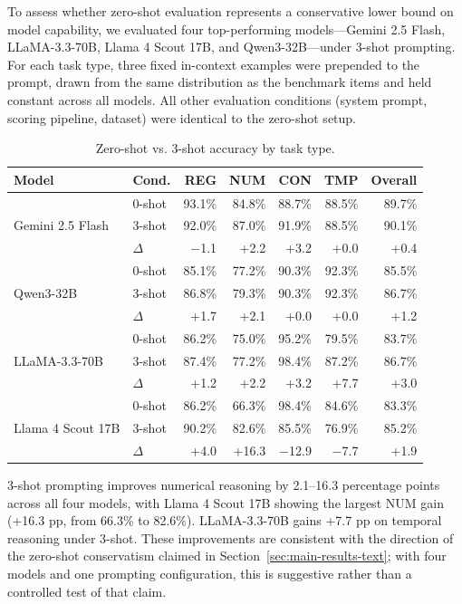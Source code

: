 To assess whether zero-shot evaluation represents a conservative lower bound on model capability, we evaluated four top-performing models---Gemini 2.5 Flash, LLaMA-3.3-70B, Llama 4 Scout 17B, and Qwen3-32B---under 3-shot prompting. For each task type, three fixed in-context examples were prepended to the prompt, drawn from the same distribution as the benchmark items and held constant across all models. All other evaluation conditions (system prompt, scoring pipeline, dataset) were identical to the zero-shot setup.

\begin{table}[t]
\centering\small
\begin{tabular}{llrrrrr}
\toprule
\textbf{Model} & \textbf{Cond.} & \textbf{REG} & \textbf{NUM} & \textbf{CON} & \textbf{TMP} & \textbf{Overall} \\
\midrule
\multirow{3}{*}{Gemini 2.5 Flash} & 0-shot & 93.1\% & 84.8\% & 88.7\% & 88.5\% & 89.7\% \\
 & 3-shot & 92.0\% & 87.0\% & 91.9\% & 88.5\% & 90.1\% \\
 & $\Delta$ & $-$1.1 & +2.2 & +3.2 & +0.0 & +0.4 \\
\midrule
\multirow{3}{*}{Qwen3-32B} & 0-shot & 85.1\% & 77.2\% & 90.3\% & 92.3\% & 85.5\% \\
 & 3-shot & 86.8\% & 79.3\% & 90.3\% & 92.3\% & 86.7\% \\
 & $\Delta$ & +1.7 & +2.1 & +0.0 & +0.0 & +1.2 \\
\midrule
\multirow{3}{*}{LLaMA-3.3-70B} & 0-shot & 86.2\% & 75.0\% & 95.2\% & 79.5\% & 83.7\% \\
 & 3-shot & 87.4\% & 77.2\% & 98.4\% & 87.2\% & 86.7\% \\
 & $\Delta$ & +1.2 & +2.2 & +3.2 & +7.7 & +3.0 \\
\midrule
\multirow{3}{*}{Llama 4 Scout 17B} & 0-shot & 86.2\% & 66.3\% & 98.4\% & 84.6\% & 83.3\% \\
 & 3-shot & 90.2\% & 82.6\% & 85.5\% & 76.9\% & 85.2\% \\
 & $\Delta$ & +4.0 & +16.3 & $-$12.9 & $-$7.7 & +1.9 \\
\bottomrule
\end{tabular}
\caption{Zero-shot vs. 3-shot accuracy by task type.}
\label{tab:e1}
\end{table}

3-shot prompting improves numerical reasoning by 2.1--16.3 percentage points across all four models, with Llama 4 Scout 17B showing the largest NUM gain (+16.3 pp, from 66.3\% to 82.6\%). LLaMA-3.3-70B gains +7.7 pp on temporal reasoning under 3-shot. These improvements are consistent with the direction of the zero-shot conservatism claimed in Section~\ref{sec:main-results-text}; with four models and one prompting configuration, this is suggestive rather than a controlled test of that claim.


